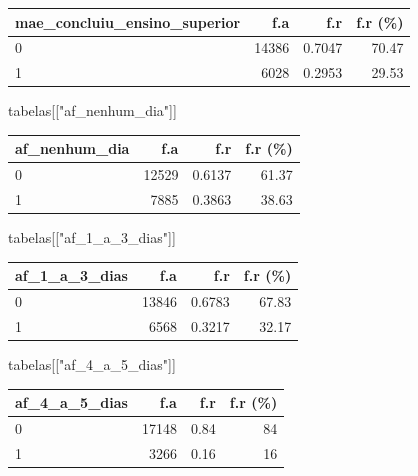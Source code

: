 \documentclass[
]{article}
\newenvironment{Shaded}{\begin{snugshade}}{\end{snugshade}}
\newcommand{\NormalTok}[1]{\textcolor[rgb]{0.00,0.23,0.31}{#1}}
\newcommand{\StringTok}[1]{\textcolor[rgb]{0.13,0.47,0.30}{#1}}
\begin{document}
\begin{longtable}[]{@{}lrrr@{}}
\toprule()
mae\_concluiu\_ensino\_superior & f.a & f.r & f.r (\%) \\
\midrule()
\endhead
0 & 14386 & 0.7047 & 70.47 \\
1 & 6028 & 0.2953 & 29.53 \\
\bottomrule()
\end{longtable}

\begin{Shaded}
\begin{Highlighting}[]
\NormalTok{tabelas[[}\StringTok{"af\_nenhum\_dia"}\NormalTok{]]}
\end{Highlighting}
\end{Shaded}

\begin{longtable}[]{@{}lrrr@{}}
\toprule()
af\_nenhum\_dia & f.a & f.r & f.r (\%) \\
\midrule()
\endhead
0 & 12529 & 0.6137 & 61.37 \\
1 & 7885 & 0.3863 & 38.63 \\
\bottomrule()
\end{longtable}

\begin{Shaded}
\begin{Highlighting}[]
\NormalTok{tabelas[[}\StringTok{"af\_1\_a\_3\_dias"}\NormalTok{]]}
\end{Highlighting}
\end{Shaded}

\begin{longtable}[]{@{}lrrr@{}}
\toprule()
af\_1\_a\_3\_dias & f.a & f.r & f.r (\%) \\
\midrule()
\endhead
0 & 13846 & 0.6783 & 67.83 \\
1 & 6568 & 0.3217 & 32.17 \\
\bottomrule()
\end{longtable}

\begin{Shaded}
\begin{Highlighting}[]
\NormalTok{tabelas[[}\StringTok{"af\_4\_a\_5\_dias"}\NormalTok{]]}
\end{Highlighting}
\end{Shaded}

\begin{longtable}[]{@{}lrrr@{}}
\toprule()
af\_4\_a\_5\_dias & f.a & f.r & f.r (\%) \\
\midrule()
\endhead
0 & 17148 & 0.84 & 84 \\
1 & 3266 & 0.16 & 16 \\
\bottomrule()
\end{longtable}
\end{document}
